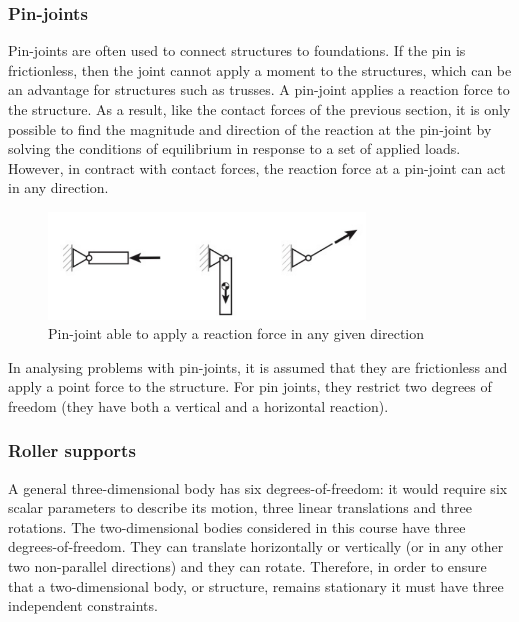 \documentclass{article}
\begin{document}
\subsubsection{Pin-joints}

Pin-joints are often used to connect structures to foundations. If the pin is frictionless, then the joint cannot apply a moment to the structures, which can be an advantage for structures such as trusses. A pin-joint applies a reaction force to the structure. As a result, like the contact forces of the previous section, it is only possible to find the magnitude and direction of the reaction at the pin-joint by solving the conditions of equilibrium in response to a set of applied loads. However, in contract with contact forces, the reaction force at a pin-joint can act in any direction.

\begin{figure}[h]
    \centering
    \includegraphics[width = 0.75\textwidth]{images/pinjoint.png}
    \caption{Pin-joint able to apply a reaction force in any given direction}
    \label{fig:enter-label}
\end{figure}

In analysing problems with pin-joints, it is assumed that they are frictionless and apply a point force to the structure. For pin joints, they restrict two degrees of freedom (they have both a vertical and a horizontal reaction).

\subsubsection{Roller supports}

A general three-dimensional body has six degrees-of-freedom: it would require six scalar
parameters to describe its motion, three linear translations and three rotations. The two-dimensional bodies considered in this course have three degrees-of-freedom. They can translate
horizontally or vertically (or in any other two non-parallel directions) and they can rotate.
Therefore, in order to ensure that a two-dimensional body, or structure, remains stationary it must
have three independent constraints.
\end{document}
